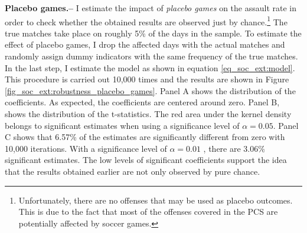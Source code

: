 \documentclass[11pt, a4paper]{article} %
\begin{document}
 
\textbf{Placebo games.--} I estimate the impact of \textit{placebo games} on the assault rate in order to check whether the obtained results are observed just by chance.\footnote{Unfortunately, there are no offenses that may be used as placebo outcomes. This is due to the fact that most of the offenses covered in the PCS are potentially affected by soccer games.} The true matches take place on roughly  5\% of the days in the sample. To estimate the effect of placebo games, I drop the affected days with the actual matches and randomly assign dummy indicators with the same frequency of the true matches. In the last step, I estimate the model as shown in equation \ref{eq_soc_ext:model}. This procedure is carried out 10,000 times and the results are shown in Figure \ref{fig_soc_ext:robustness_placebo_games}. Panel A shows the distribution of the coefficients. As expected, the coefficients are centered around zero. Panel B, shows the distribution of the t-statistics. The red area under the kernel density belongs to significant estimates when using a significance level of $\alpha=0.05$. Panel C shows that 6.57\% of the estimates are significantly different from zero with 10,000 iterations. With a significance level of $\alpha=0.01$ , there are 3.06\% significant estimates. The low levels of significant coefficients support the idea that the results obtained earlier are not only observed by pure chance. 
\end{document}

